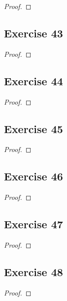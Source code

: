 \documentclass[14pt]{extarticle}
\begin{document}
\begin{proof}

\end{proof}

\subsection{Exercise 43}

\begin{proof}

\end{proof}

\subsection{Exercise 44}

\begin{proof}

\end{proof}

\subsection{Exercise 45}

\begin{proof}

\end{proof}

\subsection{Exercise 46}

\begin{proof}

\end{proof}

\subsection{Exercise 47}

\begin{proof}

\end{proof}

\subsection{Exercise 48}

\begin{proof}

\end{proof}
\end{document}
